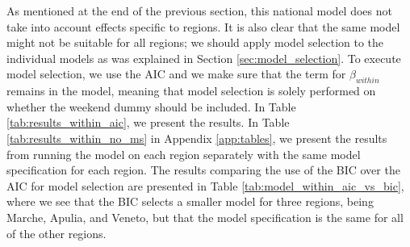 \documentclass[12pt]{article}
\begin{document}
	As mentioned at the end of the previous section, this national model does not take into account effects specific to regions. It is also clear that the same model might not be suitable for all regions; we should apply model selection to the individual models as was explained in Section \ref{sec:model_selection}. To execute model selection, we use the AIC and we make sure that the term for $\beta_{within}$ remains in the model, meaning that model selection is solely performed on whether the weekend dummy should be included. In Table \ref{tab:results_within_aic}, we present the results. In Table \ref{tab:results_within_no_ms} in Appendix \ref{app:tables}, we present the results from running the model on each region separately with the same model specification for each region. The results comparing the use of the BIC over the AIC for model selection are presented in Table \ref{tab:model_within_aic_vs_bic}, where we see that the BIC selects a smaller model for three regions, being Marche, Apulia, and Veneto, but that the model specification is the same for all of the other regions.
	
\end{document}
